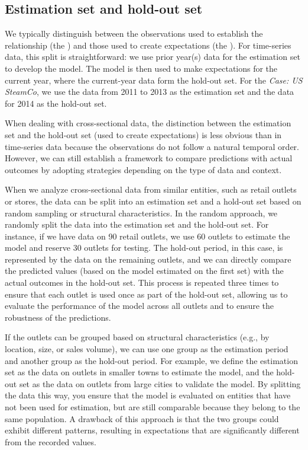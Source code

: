 \subsection{Estimation set and hold-out set} %
\label{sub:estimation_set_and_hold_out_set}

We typically distinguish between the observations used to establish the relationship (the ) and those used to create expectations (the ). 
For time-series data, this split is straightforward: we use prior year(s) data for the estimation set to develop the model. The model is then used to make expectations for the current year, where the current-year data form the hold-out set. For the \emph{Case: US SteamCo}, we use the data from 2011 to 2013 as the estimation set and the data for 2014 as the hold-out set.

When dealing with cross-sectional data, the distinction between the estimation set and the hold-out set (used to create expectations) is less obvious than in time-series data because the observations do not follow a natural temporal order. However, we can still establish a framework to compare predictions with actual outcomes by adopting strategies depending on the type of data and context.

When we analyze cross-sectional data from similar entities, such as retail outlets or stores, the data can be split into an estimation set and a hold-out set based on random sampling or structural characteristics. In the random approach, we randomly split the data into the estimation set and the hold-out set. For instance, if we have data on 90 retail outlets, we use 60 outlets to estimate the model and reserve 30 outlets for testing. The hold-out period, in this case, is represented by the data on the remaining outlets, and we can directly compare the predicted values (based on the model estimated on the first set) with the actual outcomes in the hold-out set. This process is repeated three times to ensure that each outlet is used once as part of the hold-out set, allowing us to evaluate the performance of the model across all outlets and to ensure the robustness of the predictions.

If the outlets can be grouped based on structural characteristics (e.g., by location, size, or sales volume), we can use one group as the estimation period and another group as the hold-out period. For example, we define the estimation set as the data on outlets in smaller towns to estimate the model, and the hold-out set as the data on outlets from large cities to validate the model.
By splitting the data this way, you ensure that the model is evaluated on entities that have not been used for estimation, but are still comparable because they belong to the same population. A drawback of this approach is that the two groups could exhibit different patterns, resulting in expectations that are significantly different from the recorded values.

